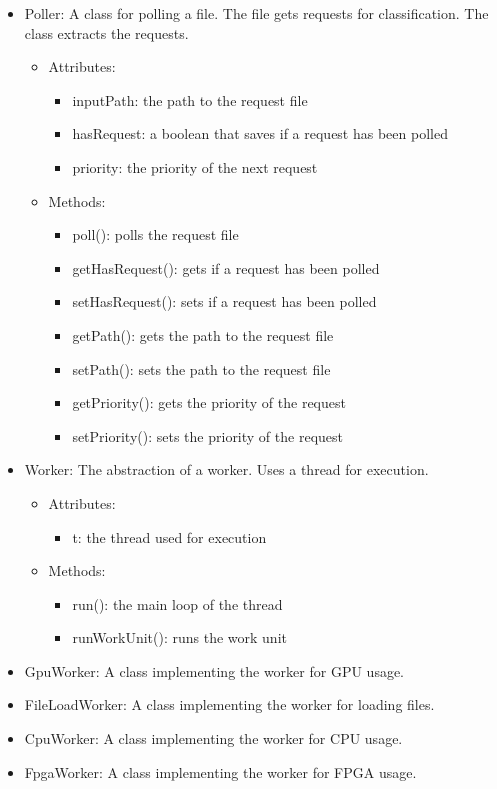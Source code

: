 \documentclass[parskip=full]{scrartcl}
\begin{document}
\pagebreak



\begin{itemize}
	\item Poller: A class for polling a file. The file gets requests for classification. The class extracts the requests.
	\begin{itemize}
		\item Attributes:
		\begin{itemize}
			\item inputPath: the path to the request file
			\item hasRequest: a boolean that saves if a request has been polled
			\item priority: the priority of the next request
		\end{itemize}
		\item Methods:
		\begin{itemize}
			\item poll(): polls the request file
			\item getHasRequest(): gets if a request has been polled
			\item setHasRequest(): sets if a request has been polled
			\item getPath(): gets the path to the request file
			\item setPath(): sets the path to the request file
			\item getPriority(): gets the priority of the request
			\item setPriority(): sets the priority of the request
		\end{itemize}
	\end{itemize}
\end{itemize}



\pagebreak



\begin{itemize}
	\item Worker: The abstraction of a worker. Uses a thread for execution.
	\begin{itemize}
		\item Attributes:
		\begin{itemize}
			\item t: the thread used for execution
		\end{itemize}
		\item Methods:
		\begin{itemize}
			\item run(): the main loop of the thread
			\item runWorkUnit(): runs the work unit
		\end{itemize}
	\end{itemize}
	\item GpuWorker: A class implementing the worker for GPU usage.
	\item FileLoadWorker: A class implementing the worker for loading files.
	\item CpuWorker: A class implementing the worker for CPU usage.
	\item FpgaWorker: A class implementing the worker for FPGA usage.
\end{itemize}
\end{document}
